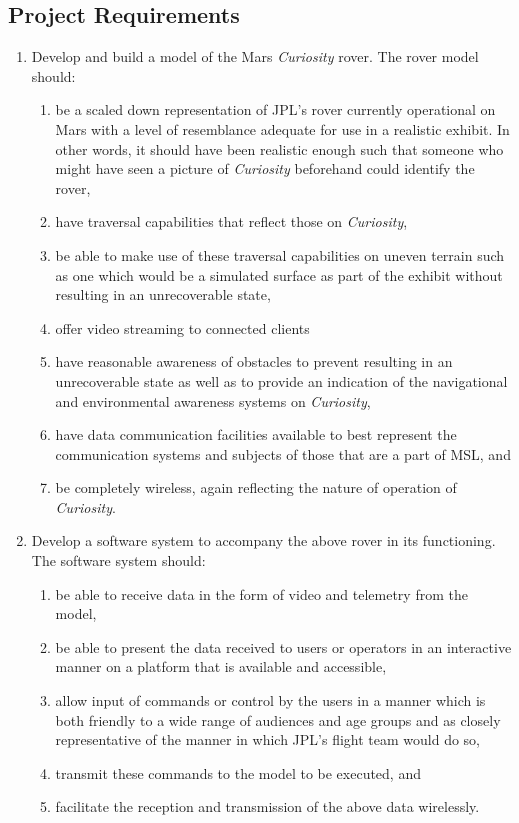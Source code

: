   \subsection{Project Requirements}
  \begin{enumerate}
    \item Develop and build a model of the Mars \textit{Curiosity} rover. The rover model should:
    \begin{enumerate}
      \item\label{enum:req-scaledrover} be a scaled down representation of JPL's rover currently operational on Mars with a level of resemblance adequate for use in a realistic exhibit. In other words, it should have been realistic enough such that someone who might have seen a picture of \textit{Curiosity} beforehand could identify the rover,
      \item have traversal capabilities that reflect those on \textit{Curiosity},
      \item be able to make use of these traversal capabilities on uneven terrain such as one which would be a simulated surface as part of the exhibit without resulting in an unrecoverable state,
      \item offer video streaming to connected clients
      \item have reasonable awareness of obstacles to prevent resulting in an unrecoverable state as well as to provide an indication of the navigational and environmental awareness systems on \textit{Curiosity},
      \item have data communication facilities available to best represent the communication systems and subjects of those that are a part of MSL, and
      \item be completely wireless, again reflecting the nature of operation of \textit{Curiosity}.
    \end{enumerate}
    \item Develop a software system to accompany the above rover in its functioning. The software system should:
    \begin{enumerate}
      \item be able to receive data in the form of video and telemetry from the model,
      \item be able to present the data received to users or operators in an interactive manner on a platform that is available and accessible,
      \item allow input of commands or control by the users in a manner which is both friendly to a wide range of audiences and age groups and as closely representative of the manner in which JPL's flight team would do so,
      \item transmit these commands to the model to be executed, and
      \item facilitate the reception and transmission of the above data wirelessly.
    \end{enumerate}
  \end{enumerate}
  
